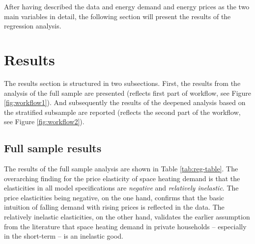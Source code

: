 \documentclass[12pt,twoside]{reedthesis}
\begin{document}
After having described the data and energy demand and energy prices as the two main variables in detail, the following section will present the results of the regression analysis.

\hypertarget{results}{%
\chapter{Results}\label{results}}

The results section is structured in two subsections. First, the results from the analysis of the full sample are presented (reflects first part of workflow, see Figure \ref{fig:workflow1}). And subsequently the results of the deepened analysis based on the stratified subsample are reported (reflects the second part of the workflow, see Figure \ref{fig:workflow2}).

\hypertarget{full_sample_results}{%
\section{Full sample results}\label{full_sample_results}}

The results of the full sample analysis are shown in Table \ref{tab:reg-table}. The overarching finding for the price elasticity of space heating demand is that the elasticities in all model specifications are \emph{negative} and \emph{relatively inelastic}. The price elasticities being negative, on the one hand, confirms that the basic intuition of falling demand with rising prices is reflected in the data. The relatively inelastic elasticities, on the other hand, validates the earlier assumption from the literature that space heating demand in private households -- especially in the short-term -- is an inelastic good.
\end{document}
